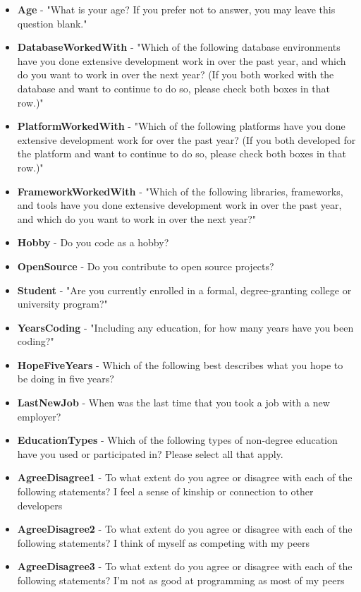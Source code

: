 \begin{appendices}
\begin{itemize}
        \item \textbf{Age} - "What is your age? If you prefer not to answer, you may leave this question blank."
        \item \textbf{DatabaseWorkedWith} - "Which of the following database environments have you done extensive development work in over the past year, and which do you want to work in over the next year?   (If you both worked with the database and want to continue to do so, please check both boxes in that row.)"
        \item \textbf{PlatformWorkedWith} - "Which of the following platforms have you done extensive development work for over the past year?   (If you both developed for the platform and want to continue to do so, please check both boxes in that row.)"
        \item \textbf{FrameworkWorkedWith} - "Which of the following libraries, frameworks, and tools have you done extensive development work in over the past year, and which do you want to work in over the next year?"
        \item \textbf{Hobby} - Do you code as a hobby?
        \item \textbf{OpenSource} - Do you contribute to open source projects?
        \item \textbf{Student} - "Are you currently enrolled in a formal, degree-granting college or university program?"
        \item \textbf{YearsCoding} - "Including any education, for how many years have you been coding?"
        \item \textbf{HopeFiveYears} - Which of the following best describes what you hope to be doing in five years?
        \item \textbf{LastNewJob} - When was the last time that you took a job with a new employer?
        \item \textbf{EducationTypes} - Which of the following types of non-degree education have you used or participated in? Please select all that apply.
        \item \textbf{AgreeDisagree1} - To what extent do you agree or disagree with each of the following statements? I feel a sense of kinship or connection to other developers
        \item \textbf{AgreeDisagree2} - To what extent do you agree or disagree with each of the following statements? I think of myself as competing with my peers
        \item \textbf{AgreeDisagree3} - To what extent do you agree or disagree with each of the following statements? I'm not as good at programming as most of my peers

\end{itemize}
\end{appendices}
